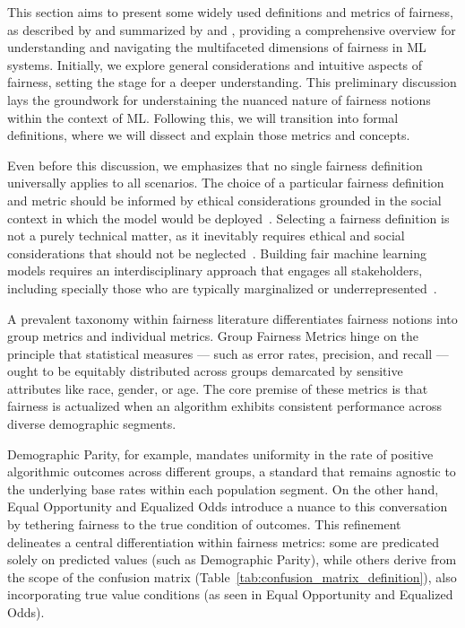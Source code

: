 This section aims to present some widely used definitions and metrics of fairness, as described by \cite{Verma2018} and summarized by \cite{Mehrabi2019} and \cite{caton2023}, providing a comprehensive overview for understanding and navigating the multifaceted dimensions of fairness in ML systems. Initially, we explore general considerations and intuitive aspects of fairness, setting the stage for a deeper understanding. This preliminary discussion lays the groundwork for understaining the nuanced nature of fairness notions within the context of ML. Following this, we will transition into formal definitions, where we will dissect and explain those metrics and concepts.

Even before this discussion, we emphasizes that no single fairness definition universally applies to all scenarios. The choice of a particular fairness definition and metric should be informed by ethical considerations grounded in the social context in which the model would be deployed~\citep{AlerTubella2022}. Selecting a fairness definition is not a purely technical matter, as it inevitably requires ethical and social considerations that should not be neglected~\citep{Alves2023}. Building fair machine learning models requires an interdisciplinary approach that engages all stakeholders, including specially those who are typically marginalized or underrepresented~\citep{Weinberg2022}.

A prevalent taxonomy within fairness literature differentiates fairness notions into group metrics and individual metrics. Group Fairness Metrics hinge on the principle that statistical measures — such as error rates, precision, and recall — ought to be equitably distributed across groups demarcated by sensitive attributes like race, gender, or age. The core premise of these metrics is that fairness is actualized when an algorithm exhibits consistent performance across diverse demographic segments.

Demographic Parity, for example, mandates uniformity in the rate of positive algorithmic outcomes across different groups, a standard that remains agnostic to the underlying base rates within each population segment. On the other hand, Equal Opportunity and Equalized Odds introduce a nuance to this conversation by tethering fairness to the true condition of outcomes. This refinement delineates a central differentiation within fairness metrics: some are predicated solely on predicted values (such as Demographic Parity), while others derive from the scope of the confusion matrix (Table~\ref{tab:confusion_matrix_definition}), also incorporating true value conditions (as seen in Equal Opportunity and Equalized Odds).

